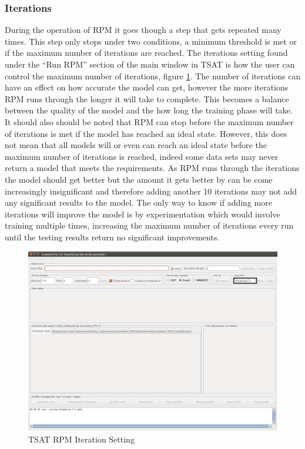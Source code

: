 \documentclass[letterpaper, 12pt]{article}
\begin{document}
\newpage
\subsubsection{Iterations}
During the operation of RPM it goes though a step that gets repeated many times. This step only stops under two conditions, a minimum threshold is met or if the maximum number of iterations are reached. The iterations setting found under the ``Run RPM'' section of the main window in TSAT is how the user can control the maximum number of iterations, figure \ref{fig:TSAT-iteration-setting}. The number of iterations can have an effect on how accurate the model can get, however the more iterations RPM runs through the longer it will take to complete. This becomes a balance between the quality of the model and the how long the training phase will take. It should also should be noted that RPM can stop before the maximum number of iterations is met if the model has reached an ideal state. However, this does not mean that all models will or even can reach an ideal state before the maximum number of iterations is reached, indeed some data sets may never return a model that meets the requirements. As RPM runs through the iterations the model should get better but the amount it gets better by can be come increasingly insignificant and therefore adding another 10 iterations may not add any significant results to the model. The only way to know if adding more iterations will improve the model is by experimentation which would involve training multiple times, increasing the maximum number of iterations every run until the testing results return no significant improvements.

\begin{figure}[H]
	\includegraphics[width=\textwidth]{TSAT-iterations-setting}
	\caption{TSAT RPM Iteration Setting}
	\label{fig:TSAT-iteration-setting}
\end{figure}
\end{document}
